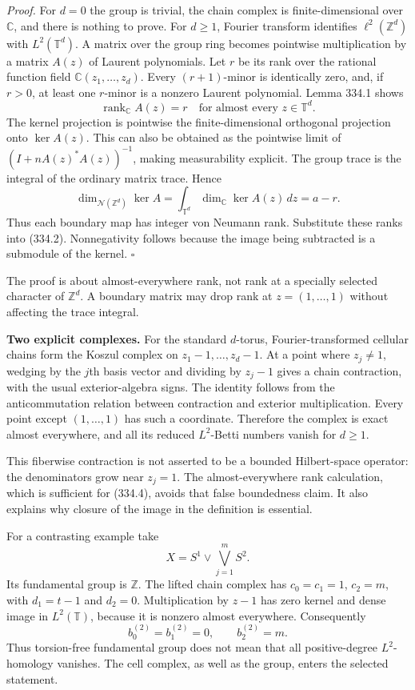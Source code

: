 \documentclass[11pt]{article}
\begin{document}
\emph{Proof.} For $d=0$ the group is trivial, the chain complex is finite-dimensional over $\mathbb C$, and there is nothing to prove. For $d\geq1$, Fourier transform identifies $\ell^2(\mathbb Z^d)$ with $L^2(\mathbb T^d)$. A matrix over the group ring becomes pointwise multiplication by a matrix $A(z)$ of Laurent polynomials. Let $r$ be its rank over the rational function field $\mathbb C(z_1,\ldots,z_d)$. Every $(r+1)$-minor is identically zero, and, if $r>0$, at least one $r$-minor is a nonzero Laurent polynomial. Lemma 334.1 shows
\[
 \operatorname{rank}_{\mathbb C}A(z)=r
 \quad\text{for almost every }z\in\mathbb T^d.
\]
The kernel projection is pointwise the finite-dimensional orthogonal projection onto $\ker A(z)$. This can also be obtained as the pointwise limit of $(I+nA(z)^*A(z))^{-1}$, making measurability explicit. The group trace is the integral of the ordinary matrix trace. Hence
\[
 \dim_{\mathcal N(\mathbb Z^d)}\ker A
    =\int_{\mathbb T^d}\dim_{\mathbb C}\ker A(z)\,dz
    =a-r.
 \tag{334.4}
\]
Thus each boundary map has integer von Neumann rank. Substitute these ranks into (334.2). Nonnegativity follows because the image being subtracted is a submodule of the kernel. $\square$

The proof is about almost-everywhere rank, not rank at a specially selected character of $\mathbb Z^d$. A boundary matrix may drop rank at $z=(1,\ldots,1)$ without affecting the trace integral.

\textbf{Two explicit complexes.} For the standard $d$-torus, Fourier-transformed cellular chains form the Koszul complex on $z_1-1,\ldots,z_d-1$. At a point where $z_j\ne1$, wedging by the $j$th basis vector and dividing by $z_j-1$ gives a chain contraction, with the usual exterior-algebra signs. The identity follows from the anticommutation relation between contraction and exterior multiplication. Every point except $(1,\ldots,1)$ has such a coordinate. Therefore the complex is exact almost everywhere, and all its reduced $L^2$-Betti numbers vanish for $d\geq1$.

This fiberwise contraction is not asserted to be a bounded Hilbert-space operator: the denominators grow near $z_j=1$. The almost-everywhere rank calculation, which is sufficient for (334.4), avoids that false boundedness claim. It also explains why closure of the image in the definition is essential.

For a contrasting example take
\[
 X=S^1\vee\bigvee_{j=1}^m S^2.
\]
Its fundamental group is $\mathbb Z$. The lifted chain complex has $c_0=c_1=1$, $c_2=m$, with $d_1=t-1$ and $d_2=0$. Multiplication by $z-1$ has zero kernel and dense image in $L^2(\mathbb T)$, because it is nonzero almost everywhere. Consequently
\[
 b_0^{(2)}=b_1^{(2)}=0,\qquad b_2^{(2)}=m.
\]
Thus torsion-free fundamental group does not mean that all positive-degree $L^2$-homology vanishes. The cell complex, as well as the group, enters the selected statement.
\end{document}
